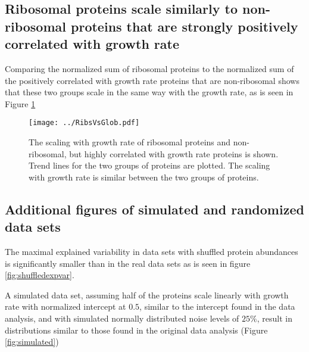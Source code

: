 \documentclass{article}
\begin{document}
\begin{table}[H]
\centering
{}
\caption{\label{tab:corrbreakdownv}
Breakdown by function of strongly positively correlated with growth rate proteins in the data set from \cite{Peebo_2015}%
}
\end{table}

\subsection{Ribosomal proteins scale similarly to non-ribosomal proteins that are strongly positively correlated with growth rate}
Comparing the normalized sum of ribosomal proteins to the normalized sum of the positively correlated with growth rate proteins that are non-ribosomal shows that these two groups scale in the same way with the growth rate, as is seen in Figure \ref{fig:ribsnonribs}


\begin{figure}[H]
\begin{center}
\texttt{[image: ../RibsVsGlob.pdf]}
\caption{\label{fig:ribsnonribs}
  The scaling with growth rate of ribosomal proteins and non-ribosomal, but highly correlated with growth rate proteins is shown.
Trend lines for the two groups of proteins are plotted.
The scaling with growth rate is similar between the two groups of proteins.
%
}
\end{center}
\end{figure}

\subsection{Additional figures of simulated and randomized data sets}
The maximal explained variability in data sets with shuffled protein abundances is significantly smaller than in the real data sets as is seen in figure \ref{fig:shuffledexpvar}.

A simulated data set, assuming half of the proteins scale linearly with growth rate with normalized intercept at $0.5$, similar to the intercept found in the data analysis, and with simulated normally distributed noise levels of $25\%$, result in distributions similar to those found in the original data analysis (Figure \ref{fig:simulated})
\end{document}
